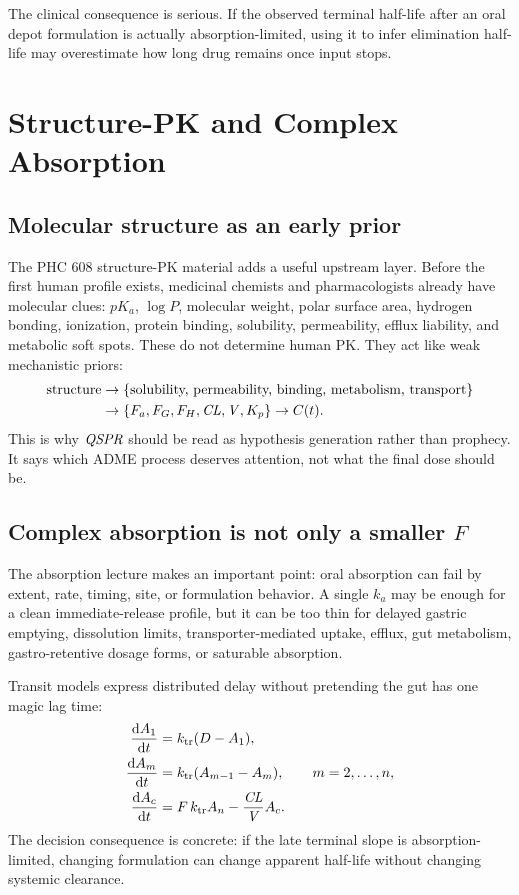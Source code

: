\documentclass[a4paper]{article}
\newcommand{\pkCL}{\pksym{CL}}
\newcommand{\pkV}{\pksym{V}}
\newcommand{\pkQSPR}{\pksym{QSPR}}
\begin{document}
The clinical consequence is serious. If the observed terminal half-life after an oral depot formulation is actually absorption-limited, using it to infer elimination half-life may overestimate how long drug remains once input stops.

\section{Structure-PK and Complex Absorption}

\subsection{Molecular structure as an early prior}

The PHC 608 structure-PK material adds a useful upstream layer. Before the first human profile exists, medicinal chemists and pharmacologists already have molecular clues: \(pK_a\), \(\log P\), molecular weight, polar surface area, hydrogen bonding, ionization, protein binding, solubility, permeability, efflux liability, and metabolic soft spots. These do not determine human PK. They act like weak mechanistic priors:
\[
  \begin{aligned}
  \text{structure}
  &\to
  \{\text{solubility, permeability, binding, metabolism, transport}\}\\
  &\to
  \{F_a,F_G,F_H,\pkCL,\pkV,K_p\}
  \to C(t).
  \end{aligned}
\]
This is why \(\pkQSPR\) should be read as hypothesis generation rather than prophecy. It says which ADME process deserves attention, not what the final dose should be.

\figureStructureAbsorptionMap

\subsection{Complex absorption is not only a smaller \(F\)}

The absorption lecture makes an important point: oral absorption can fail by extent, rate, timing, site, or formulation behavior. A single \(k_a\) may be enough for a clean immediate-release profile, but it can be too thin for delayed gastric emptying, dissolution limits, transporter-mediated uptake, efflux, gut metabolism, gastro-retentive dosage forms, or saturable absorption.

Transit models express distributed delay without pretending the gut has one magic lag time:
\[
  \begin{aligned}
  \frac{\dd A_1}{\dd t} &= k_{\pklab{tr}}(D-A_1),\\
  \frac{\dd A_m}{\dd t} &= k_{\pklab{tr}}(A_{m-1}-A_m),\qquad m=2,\ldots,n,\\
  \frac{\dd A_c}{\dd t} &= F\,k_{\pklab{tr}}A_n-\frac{\pkCL}{\pkV}A_c.
  \end{aligned}
\]
The decision consequence is concrete: if the late terminal slope is absorption-limited, changing formulation can change apparent half-life without changing systemic clearance.
\end{document}
